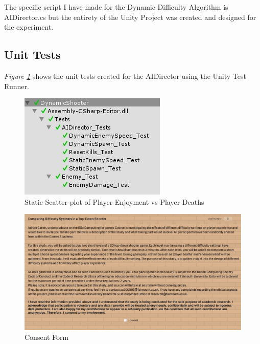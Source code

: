 \documentclass[journal]{IEEEtran}
\begin{document}
The specific script I have made for the Dynamic Difficulty Algorithm is AIDirector.cs but the entirety of the Unity Project was created and designed for the experiment.

\subsection{Unit Tests}
\textit{Figure \ref{fig::8}} shows the unit tests created for the AIDirector using the Unity Test Runner.

\begin{figure}[h]
	\includegraphics[width=1.0\linewidth]{unittests.jpg}
	\caption{Static Scatter plot of Player Enjoyment vs Player Deaths}
	\label{fig::8}
\end{figure}

\begin{figure}[h]
	\includegraphics[width=0.75\linewidth]{consentformingame.jpg}
	\caption{Consent Form}
	\label{fig::9}
\end{figure} 
\end{document}
